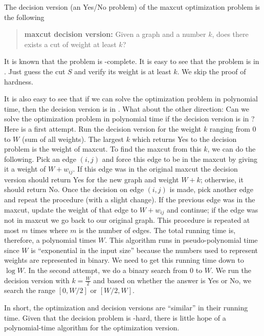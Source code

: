 \documentclass[12pt,
    driverfallback=dvipdfm,
 	openany,
    a4paper,
    toc=bibliography,
    twoside,
    numbers=noenddot]{article}              %
\begin{document}
\begin{mdframed}[backgroundcolor=light-gray, linecolor=light-gray]
The decision version (an Yes/No problem) of the maxcut optimization problem is the following
\begin{quote}
{\bf maxcut decision version:} Given a graph and a number $k$, does there exists a cut of weight at least $k$?
\end{quote}
It is known that the problem is \NP-complete. It is easy to see that the problem is in \NP. Just guess the cut $S$ and verify its weight is at least $k$. We skip the proof of hardness. 

It is also easy to see that if we can solve the optimization problem in polynomial time, then the decision version is in \Ptime. What about the other direction: Can we solve the optimization problem in polynomial time if the decision version is in \Ptime? Here is a first attempt. Run the decision version for the weight $k$ ranging from $0$ to $W$ (sum of all weights). The largest $k$ which returns Yes to the decision problem is the weight of maxcut. To find the maxcut from this $k$, we can do the following. Pick an edge $(i,j)$ and force this edge to be in the maxcut by giving it a weight of $W+w_{ij}$. If this edge was in the original maxcut the decision version should return Yes for the new graph and weight $W+k$; otherwise, it should return No. Once the decision on edge $(i,j)$ is made, pick another edge and repeat the procedure (with a slight change). If the previous edge was in the maxcut, update the weight of that edge to $W+w_{ij}$ and continue; if the edge was not in maxcut we go back to our original graph. This procedure is repeated at most $m$ times where $m$ is the number of edges. The total running time is, therefore, a polynomial times $W$. This algorithm runs in pseudo-polynomial time since $W$ is ``exponential in the input size'' because the numbers used to represent weights are represented in binary. We need to get this running time down to $\log W$. In the second attempt, we do a binary search from $0$ to $W$. We run the decision version with $k=\frac{W}{2}$ and based on whether the answer is Yes or No, we search the range $[0, W/2]$ or $[W/2, W]$. 

In short, the optimization and decision versions are ``similar'' in their running time. Given that the decision problem is \NP-hard, there is little hope of a polynomial-time algorithm for the optimization version. 
\end{mdframed}
\end{document}
